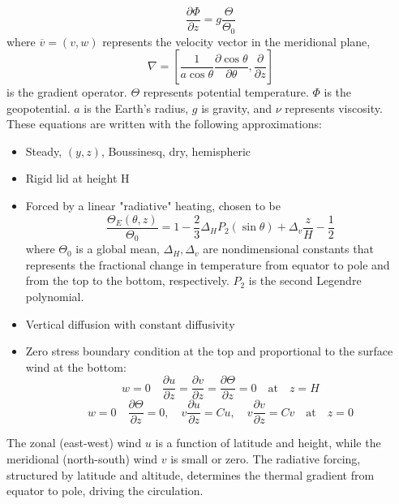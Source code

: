 \[
\frac{\partial \Phi}{\partial z} = g \frac{\Theta}{\Theta_0}
\]
where $\overline{v}=(v,w)$ represents the velocity vector in the meridional plane, $$\nabla=\left[\frac{1}{a\cos\theta}\frac{\partial\cos\theta}{\partial\theta}, \frac{\partial}{\partial z}\right]$$ is the gradient operator. 
$\Theta$ represents potential temperature.
$\Phi$ is the geopotential.
$a$ is the Earth's radius, $g$ is gravity, and $\nu$ represents viscosity.
These equations are written with the following approximations:
\begin{itemize}
    \item Steady, $(y,z)$, Boussinesq, dry, hemispheric
    \item Rigid lid at height H
    \item Forced by a linear "radiative" heating, chosen to be $$\frac{\Theta_E(\theta,z)}{\Theta_0}=1 - \frac{2}{3} \Delta_H P_2(\sin\theta) + \Delta_v \frac{z}{H} - \frac{1}{2}$$ where $\Theta_0$ is a global mean, $\Delta_H, \Delta_v$ are nondimensional constants that represents the fractional change in temperature from equator to pole and from the
top to the bottom, respectively. $P_2$ is the second Legendre polynomial.
    \item Vertical diffusion with constant diffusivity
    \item Zero stress boundary condition at the top and proportional to the surface wind at the bottom: 
$$w=0\quad\frac{\partial u}{\partial z}=\frac{\partial v}{\partial z}=\frac{\partial\Theta}{\partial z}=0\quad\text{at}\quad z=H$$
$$w=0\quad\frac{\partial \Theta}{\partial z}=0,\quad v\frac{\partial u}{\partial z}=Cu,\quad v\frac{\partial v}{\partial z}=Cv\quad\text{at}\quad z=0$$
\end{itemize}

The zonal (east-west) wind $u$ is a function of latitude and height, while the meridional (north-south) wind $v$ is small or zero. The radiative forcing, structured by latitude and altitude, determines the thermal gradient from equator to pole, driving the circulation. 


